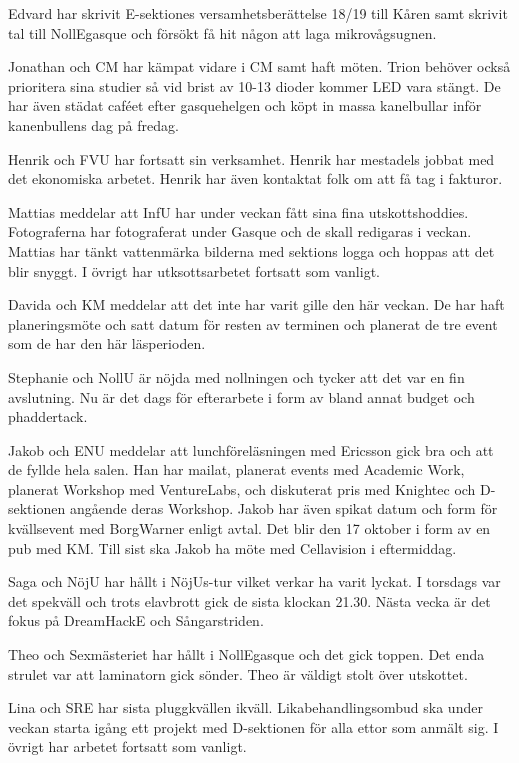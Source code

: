 \documentclass[10pt]{article}
\begin{document}
\begin{paragrafer}
\begin{paragrafer}
Edvard har skrivit E-sektiones versamhetsberättelse 18/19 till Kåren samt skrivit tal till NollEgasque och försökt få hit någon att laga mikrovågsugnen.

Jonathan och CM har kämpat vidare i CM samt haft möten. Trion behöver också prioritera sina studier så vid brist av 10-13 dioder kommer LED vara stängt. 
De har även städat caféet efter gasquehelgen och köpt in massa kanelbullar inför kanenbullens dag på fredag. 

Henrik och FVU har fortsatt sin verksamhet. Henrik har mestadels jobbat med det ekonomiska arbetet. Henrik har även kontaktat folk om att få tag i fakturor. 

Mattias meddelar att InfU har under veckan fått sina fina utskottshoddies.
Fotograferna har fotograferat under Gasque och de skall redigaras i veckan. Mattias har tänkt vattenmärka bilderna med sektions logga och hoppas att det blir snyggt. 
I övrigt har utksottsarbetet fortsatt som vanligt.  

Davida och KM meddelar att det inte har varit gille den här veckan. De har haft planeringsmöte och satt datum för resten av terminen och planerat de tre event som de har den här läsperioden. 

Stephanie och NollU är nöjda med nollningen och tycker att det var en fin avslutning. Nu är det dags för efterarbete i form av bland annat budget och phaddertack. 

Jakob och ENU meddelar att lunchföreläsningen med Ericsson gick bra och att de fyllde hela salen. Han har mailat, planerat events med Academic Work, planerat Workshop med VentureLabs, och diskuterat pris med Knightec och D-sektionen angående deras Workshop. 
Jakob har även spikat datum och form för kvällsevent med BorgWarner enligt avtal. Det blir den 17 oktober i form av en pub med KM. Till sist ska Jakob ha möte med Cellavision i eftermiddag.  

Saga och NöjU har hållt i NöjUs-tur vilket verkar ha varit lyckat. I torsdags var det spekväll och trots elavbrott gick de sista klockan 21.30. Nästa vecka är det fokus på DreamHackE och Sångarstriden.

Theo och Sexmästeriet har hållt i NollEgasque och det gick toppen. Det enda strulet var att laminatorn gick sönder. Theo är väldigt stolt över utskottet.

Lina och SRE har sista pluggkvällen ikväll. Likabehandlingsombud ska under veckan starta igång ett projekt med D-sektionen för alla ettor som anmält sig. I övrigt har arbetet fortsatt som vanligt. 


\end{paragrafer}
\end{paragrafer}
\end{document}
